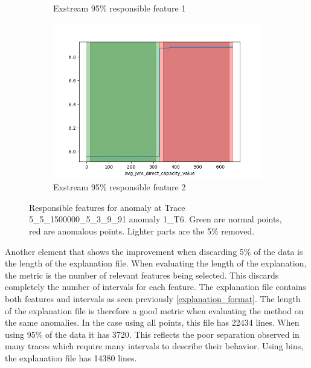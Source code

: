 \documentclass[oneside, a4paper, onecolumn, 11pt]{article}
\begin{document}
\begin{figure}[H]
\begin{subfigure}{0.3\textwidth}
      \caption{Exstream 95\% responsible feature 1}
  \end{subfigure}
  \hfill
  \begin{subfigure}{0.3\textwidth}
      \centering
      \includegraphics[width=\linewidth]{images/ex_remove52.png}
      \caption{Exstream 95\% responsible feature 2}
  \end{subfigure}
  \caption{Responsible features for anomaly at Trace 5\_5\_1500000\_5\_3\_9\_91 anomaly 1\_T6. Green are normal points, red are anomalous points. Lighter parts are the 5\% removed.}
\end{figure}
Another element that shows the improvement when discarding 5\% of the data is the length of the explanation file. When evaluating the length of the explanation, the metric is the number of relevant features being selected. This discards completely the number of intervals for each feature. The explanation file contains both features and intervals as seen previously \autoref{explanation_format}. The length of the explanation file is therefore a good metric when evaluating the method on the same anomalies. In the case using all points, this file has 22434 lines. When using 95\% of the data it has 3720. This reflects the poor separation observed in many traces which require many intervals to describe their behavior. Using bins, the explanation file has 14380 lines.\\
\end{document}
